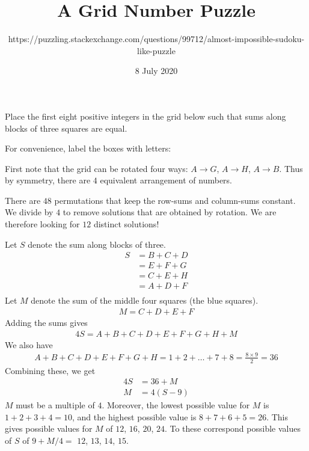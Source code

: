 \documentclass[12pt]{article}
\title{A Grid Number Puzzle}
\author{https://puzzling.stackexchange.com/questions/99712/almost-impossible-sudoku-like-puzzle}
\date{8 July 2020}
\begin{document}
\begin{question}

Place the first eight positive integers in the grid below such that sums along blocks of three squares are equal.
\begin{center}
\end{center}

\end{question}
For convenience, label the boxes with letters:
\begin{center}
\end{center}
First note that the grid can be rotated four ways: $A\longrightarrow G$, $A\longrightarrow H$, $A\longrightarrow B$. Thus by symmetry, there are $4$ equivalent arrangement of numbers. 

There are $48$ permutations that keep the row-sums and column-sums constant. We divide by $4$ to remove solutions that are obtained by rotation. We are therefore looking for $12$ distinct solutions! 

Let $S$ denote the sum along blocks of three. 
\begin{align*}
S & = B + C + D\\
  & = E + F + G\\
  & = C + E + H\\
  & = A + D + F\\
\end{align*} 
Let $M$ denote the sum of the middle four squares (the blue squares).
\begin{align*}
M = C + D + E + F
\end{align*} 
Adding the sums gives
\begin{align*}
4S = A + B + C + D + E + F + G + H + M
\end{align*}
We also have 
\begin{align*}
A + B + C + D + E + F + G + H = 1 + 2 + \ldots + 7 + 8 = \frac{8 \times 9}{2} = 36
\end{align*}
Combining these, we get
\begin{align*}
4S & = 36 + M \\
 M & = 4(S-9)
\end{align*} 
$M$ must be a multiple of $4$. Moreover, the lowest possible value for $M$ is $1+2+3+4=10$, and the highest possible value is $8+7+6+5=26$. This gives possible values for $M$ of $12$, $16$, $20$, $24$. To these correspond possible values of $S$ of $9+M/4=$ $12$, $13$, $14$, $15$.
\end{document}
